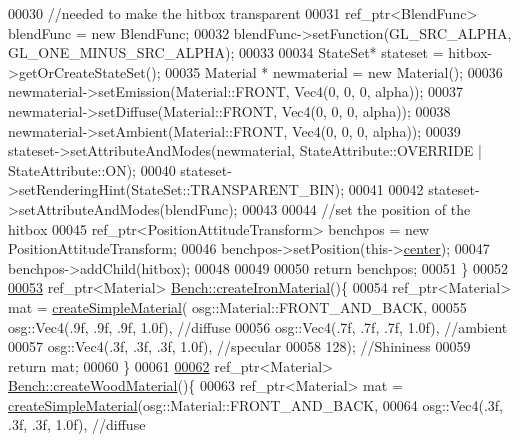 \begin{DoxyCode}
00030         \textcolor{comment}{//needed to make the hitbox transparent}
00031         ref\_ptr<BlendFunc> blendFunc = \textcolor{keyword}{new} BlendFunc;
00032         blendFunc->setFunction(GL\_SRC\_ALPHA, GL\_ONE\_MINUS\_SRC\_ALPHA);
00033 
00034         StateSet* stateset = hitbox->getOrCreateStateSet();
00035         Material * newmaterial = \textcolor{keyword}{new} Material();
00036         newmaterial->setEmission(Material::FRONT, Vec4(0, 0, 0, alpha));
00037         newmaterial->setDiffuse(Material::FRONT, Vec4(0, 0, 0, alpha));
00038         newmaterial->setAmbient(Material::FRONT, Vec4(0, 0, 0, alpha));
00039         stateset->setAttributeAndModes(newmaterial, StateAttribute::OVERRIDE | StateAttribute::ON);
00040         stateset->setRenderingHint(StateSet::TRANSPARENT\_BIN);
00041 
00042         stateset->setAttributeAndModes(blendFunc);
00043         
00044         \textcolor{comment}{//set the position of the hitbox}
00045         ref\_ptr<PositionAttitudeTransform> benchpos = \textcolor{keyword}{new} PositionAttitudeTransform;
00046         benchpos->setPosition(this->\hyperlink{classbrtr_1_1_bench_a5ea108ad6ee96d487ac00ecacc383aa2}{center});
00047         benchpos->addChild(hitbox);
00048 
00049 
00050         \textcolor{keywordflow}{return} benchpos;
00051     \}
00052     
\hypertarget{_bench_8cpp_source_l00053}{}\hyperlink{classbrtr_1_1_bench_aafa199aa2218d57b290d99843a1443d4}{00053}     ref\_ptr<Material> \hyperlink{classbrtr_1_1_bench_aafa199aa2218d57b290d99843a1443d4}{Bench::createIronMaterial}()\{
00054         ref\_ptr<Material> mat = \hyperlink{namespacebrtr_a7b54dcabf5846ea963221e59b38b0a79}{createSimpleMaterial}(   osg::Material::FRONT\_AND\_BACK,  
00055                                 osg::Vec4(.9f, .9f, .9f, 1.0f), \textcolor{comment}{//diffuse}
00056                                 osg::Vec4(.7f, .7f, .7f, 1.0f), \textcolor{comment}{//ambient}
00057                                 osg::Vec4(.3f, .3f, .3f, 1.0f), \textcolor{comment}{//specular}
00058                                 128); \textcolor{comment}{//Shininess}
00059         \textcolor{keywordflow}{return} mat;
00060     \}
00061     
\hypertarget{_bench_8cpp_source_l00062}{}\hyperlink{classbrtr_1_1_bench_a57d6d3f038d3f0e8d5f8b83895a6670a}{00062}     ref\_ptr<Material> \hyperlink{classbrtr_1_1_bench_a57d6d3f038d3f0e8d5f8b83895a6670a}{Bench::createWoodMaterial}()\{
00063         ref\_ptr<Material> mat = \hyperlink{namespacebrtr_a7b54dcabf5846ea963221e59b38b0a79}{createSimpleMaterial}(osg::Material::FRONT\_AND\_BACK, 
00064                                 osg::Vec4(.3f, .3f, .3f, 1.0f), \textcolor{comment}{//diffuse}

\end{DoxyCode}
